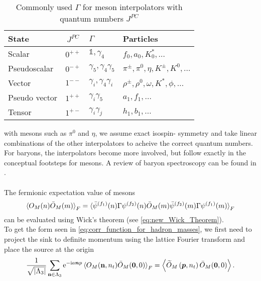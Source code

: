 \documentclass[a4paper,10pt]{book}
\begin{document}
\begin{table}
\centering
\caption[Common values of $\Gamma$ for meson interpolators]{Commonly used $\Gamma$ for meson interpolators with quantum numbers $J^{PC}$ \cite{Gattringer:2010zz}}
\begin{tabular}{lcll}
\hline State & $J^{P C}$ & $\Gamma$ & Particles \\
\hline Scalar & $0^{++}$ & $\mathbb{1}, \gamma_{4}$ & $f_{0}, a_{0}, K_{0}^{*}, \ldots$ \\
Pseudoscalar & $0^{-+}$ & $\gamma_{5}, \gamma_{4} \gamma_{5}$ & $\pi^{\pm}, \pi^{0}, \eta, K^{\pm}, K^{0}, \ldots$ \\
Vector & $1^{--}$ & $\gamma_{i}, \gamma_{4} \gamma_{i}$ & $\rho^{\pm}, \rho^{0}, \omega, K^{*}, \phi, \ldots$ \\
Pseudo vector & $1^{++}$ & $\gamma_{i} \gamma_{5}$ & $a_{1}, f_{1}, \ldots$ \\
Tensor & $1^{+-}$ & $\gamma_{i} \gamma_{j}$ & $h_{1}, b_{1}, \ldots$ \\
\hline
\end{tabular}\label{table:Interpolator_gammas}
\end{table}
with mesons such as $\pi^0$ and $\eta$, we assume exact isospin- symmetry and take linear combinations of the other interpolators to acheive the correct quantum numbers.\\For baryons, the interpolators become more involved, but follow exactly in the conceptual footsteps for mesons. A review of baryon spectroscopy can be found in \cite{leinweber2005baryon}.\\\\
The fermionic expectation value of mesons
\begin{equation}
\braket{O_{M}(n) \bar{O}_{M}(m)}_{F} = \braket{\bar{\psi}^{\left(f_{1}\right)}(n) \Gamma \psi^{\left(f_{2}\right)}(n)\\ \bar{O}_{M}(m)\bar{\psi}^{\left(f_{2}\right)}(m) \Gamma \psi^{\left(f_{1}\right)}(m)}_{F}
\end{equation}
can be evaluated using Wick's theorem (see \eqref{eq:new_Wick_Theorem}).\\To get the form seen in \eqref{eq:corr_function_for_hadron_masses}, we first need to project the sink to definite momentum using the lattice Fourier transform and place the source at the origin
\begin{equation}
\frac{1}{\sqrt{\left|\Lambda_{3}\right|}} \sum_{\mathbf{n} \in \Lambda_{3}} \mathrm{e}^{-\mathrm{i} a \boldsymbol{n} p}\braket{O_{M}(\mathbf{n},n_t) \bar{O}_{M}(\mathbf{0},0)}_{F} = \left\langle\widetilde{O}_M\left(\boldsymbol{p}, n_{t}\right) \bar{O}_M(\mathbf{0}, 0)\right\rangle.
\end{equation}
\end{document}
